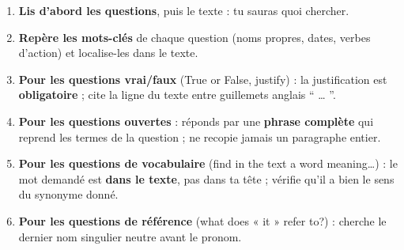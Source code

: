 \documentclass[11pt]{article}
\begin{document}
\begin{methode}
\begin{enumerate}
\item \textbf{Lis d'abord les questions}, puis le texte : tu sauras quoi chercher.
\item \textbf{Repère les mots-clés} de chaque question (noms propres, dates, verbes d'action) et localise-les dans le texte.
\item \textbf{Pour les questions vrai/faux} (True or False, justify) : la justification est \textbf{obligatoire} ; cite la ligne du texte entre guillemets anglais “ … ”.
\item \textbf{Pour les questions ouvertes} : réponds par une \textbf{phrase complète} qui reprend les termes de la question ; ne recopie jamais un paragraphe entier.
\item \textbf{Pour les questions de vocabulaire} (find in the text a word meaning\ldots) : le mot demandé est \textbf{dans le texte}, pas dans ta tête ; vérifie qu'il a bien le sens du synonyme donné.
\item \textbf{Pour les questions de référence} (what does « it » refer to?) : cherche le dernier nom singulier neutre avant le pronom.
\end{enumerate}
\end{methode}
\end{document}
